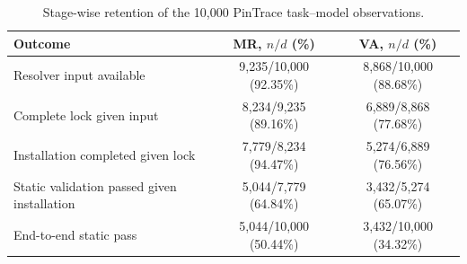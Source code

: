 \begin{table}[t]
\small
\centering
\caption{Stage-wise retention of the 10,000 PinTrace task--model observations.}
\label{tab:rq3_environment_outcomes}
\begin{tabular}{lcc}
\toprule
Outcome & MR, $n/d$ (\%) & VA, $n/d$ (\%) \\
\midrule
Resolver input available & 9,235/10,000 (92.35\%) & 8,868/10,000 (88.68\%) \\
Complete lock given input & 8,234/9,235 (89.16\%) & 6,889/8,868 (77.68\%) \\
Installation completed given lock & 7,779/8,234 (94.47\%) & 5,274/6,889 (76.56\%) \\
Static validation passed given installation & 5,044/7,779 (64.84\%) & 3,432/5,274 (65.07\%) \\
End-to-end static pass & 5,044/10,000 (50.44\%) & 3,432/10,000 (34.32\%) \\
\bottomrule
\end{tabular}
\end{table}

